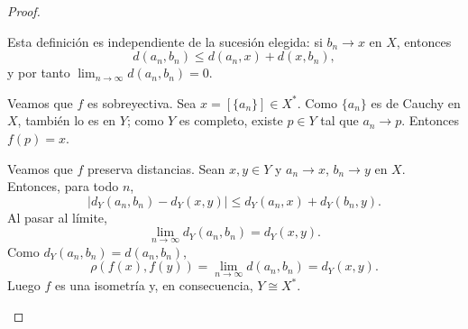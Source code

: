 \begin{proof}
\begin{enumerate}
    Esta definición es independiente de la sucesión elegida: si $b_n\to x$ en $X$, entonces
    \[
    d(a_n,b_n)\le d(a_n,x)+d(x,b_n),
    \]
    y por tanto $\lim_{n\to\infty}d(a_n,b_n)=0$.

    Veamos que $f$ es sobreyectiva. Sea $x=[\{a_n\}]\in X^*$. Como $\{a_n\}$ es de Cauchy en $X$, también lo es en $Y$; como $Y$ es completo, existe $p\in Y$ tal que $a_n\to p$. Entonces $f(p)=x$.

    Veamos que $f$ preserva distancias. Sean $x,y\in Y$ y $a_n\to x$, $b_n\to y$ en $X$. Entonces, para todo $n$,
    \[
    |d_Y(a_n,b_n)-d_Y(x,y)|\le d_Y(a_n,x)+d_Y(b_n,y).
    \]
    Al pasar al límite,
    \[
    \lim_{n\to\infty}d_Y(a_n,b_n)=d_Y(x,y).
    \]
    Como $d_Y(a_n,b_n)=d(a_n,b_n)$,
    \[
    \rho(f(x),f(y))=\lim_{n\to\infty}d(a_n,b_n)=d_Y(x,y).
    \]
    Luego $f$ es una isometría y, en consecuencia, $Y\cong X^*$.
\end{enumerate}
\end{proof}
